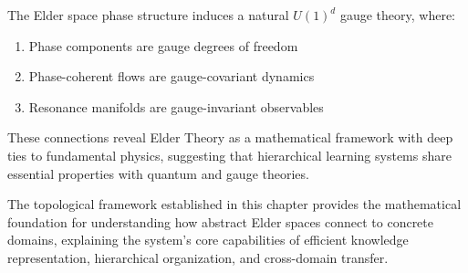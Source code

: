 \begin{theorem}
The Elder space phase structure induces a natural $U(1)^d$ gauge theory, where:
\begin{enumerate}
    \item Phase components are gauge degrees of freedom
    \item Phase-coherent flows are gauge-covariant dynamics
    \item Resonance manifolds are gauge-invariant observables
\end{enumerate}
\end{theorem}

These connections reveal Elder Theory as a mathematical framework with deep ties to fundamental physics, suggesting that hierarchical learning systems share essential properties with quantum and gauge theories.

The topological framework established in this chapter provides the mathematical foundation for understanding how abstract Elder spaces connect to concrete domains, explaining the system's core capabilities of efficient knowledge representation, hierarchical organization, and cross-domain transfer.